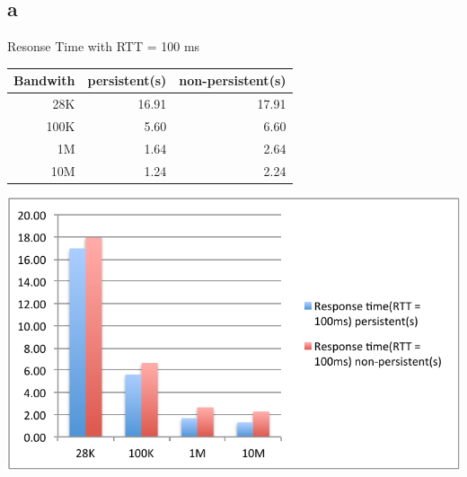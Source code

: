 \documentclass[a4paper, 11pt]{article}
\begin{document}
\subsection{a}
\begin{center}
Resonse Time with RTT = 100 ms
\vspace{4mm} 

\begin{tabular}{|r|r|r|}
\hline
Bandwith & persistent(s) & non-persistent(s)\\ \hline
28K & 16.91 & 17.91\\ \hline
100K & 5.60 & 6.60\\ \hline
1M & 1.64 & 2.64\\ \hline
10M & 1.24 & 2.24 \\ \hline
\end{tabular}
\vspace{4mm} 

\includegraphics{4a_chart.pdf}
\end{center}
\end{document}
